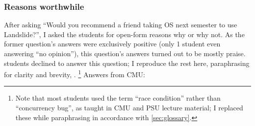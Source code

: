 \subsubsection{Reasons worthwhile}
\label{sec:education-reasons-worthwhile}

After
asking ``Would you recommend a friend taking OS next semester to use Landslide?'',
I asked the students for open-form reasons why or why not.
As the former question's answers were exclusively positive (only 1 student even answering ``no opinion''),
this question's answers turned out to be mostly praise.
 students declined to answer this question;
I reproduce the rest here, paraphrasing for clarity and brevity,
.%
\footnote{Note that most students used the term ``race condition'' rather than ``concurrency bug'',
as taught in CMU and PSU lecture material;
I replaced these while paraphrasing in accordance with \cref{sec:glossary}.}
Answers from CMU:

